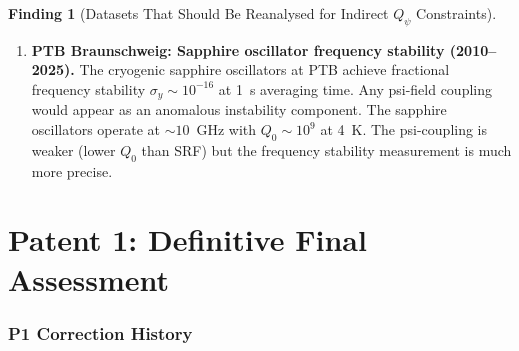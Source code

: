 \documentclass[11pt]{article}
\newcommand{\Qpsi}{Q_\psi}
\theoremstyle{definition}
\newtheorem{finding}[theorem]{Finding}
\theoremstyle{remark}
\begin{document}
\begin{finding}[Datasets That Should Be Reanalysed for Indirect $\Qpsi$ Constraints]
\begin{enumerate}[label=\textbf{D\arabic*.}, itemsep=6pt]
  \textbf{Caveat}: LIGO cavities are not superconducting; the
  psi-coupling via Process~A is suppressed by the much lower EM
  energy density in optical cavities compared with SRF cavities.

\item \textbf{PTB Braunschweig: Sapphire oscillator frequency stability
  (2010--2025).}
  The cryogenic sapphire oscillators at PTB achieve fractional
  frequency stability $\sigma_y \sim 10^{-16}$ at 1~s averaging time.
  Any psi-field coupling would appear as an anomalous instability
  component. The sapphire oscillators operate at $\sim 10$~GHz with
  $Q_0 \sim 10^9$ at 4~K. The psi-coupling is weaker (lower $Q_0$
  than SRF) but the frequency stability measurement is much more
  precise.
\end{enumerate}
\end{finding}


\part{Patent 1: Definitive Final Assessment}
\label{part:P1_final}

\section{P1 Correction History}
\label{sec:P1_history}
\end{document}
